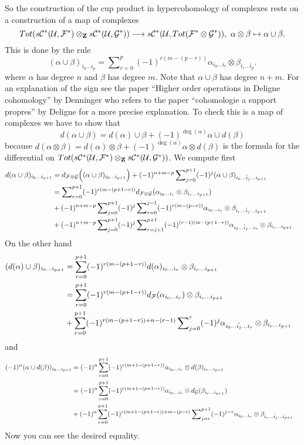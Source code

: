 \medskip\noindent
So the construction of the cup product in hypercohomology
of complexes rests on a construction of a map of complexes
$$
Tot(s{\mathcal C}^*({\mathcal U}, {\mathcal F}^*)
\otimes_{\bf Z}
s{\mathcal C}^*({\mathcal U}, {\mathcal G}^*))
\longrightarrow 
s{\mathcal C}^*({\mathcal U}, Tot({\mathcal F}^*\otimes {\mathcal G}^*)),\ 
\alpha \otimes \beta \mapsto \alpha \cup \beta.
$$
This is done by the rule
$$
(\alpha \cup \beta)_{i_0\ldots i_p}
=
\sum\nolimits_{r=0}^p
(-1)^{r(m-(p-r))}
\alpha_{i_0\ldots i_r} \otimes \beta_{i_r\ldots i_p}.
$$
where $\alpha$ has degree $n$ and $\beta$ has degree $m$.
Note that $\alpha \cup \beta$ has degree $n+m$.
For an explanation of the sign see the paper
``Higher order operations in Deligne cohomology'' by Denninger
who refers to the paper ``cohomologie a support propres'' by Deligne
for a more precise explanation.
To check this is a map of complexes we have to show that
$$
d(\alpha \cup \beta) = 
d(\alpha) \cup \beta +
(-1)^{\deg(\alpha)} \alpha \cup d(\beta)
$$
because $d(\alpha \otimes \beta) = d(\alpha)\otimes\beta
+ (-1)^{\deg(\alpha)} \alpha\otimes d(\beta)$ is the formula
for the differential on $Tot(s{\mathcal C}^*({\mathcal U}, {\mathcal F}^*)
\otimes_{\bf Z} s{\mathcal C}^*({\mathcal U}, {\mathcal G}^*))$. We compute
first
\begin{align}
d(\alpha \cup \beta)_{i_0\ldots i_{p+1}}
& =
d_{{\mathcal F}\otimes {\mathcal G}}
\Big(
(\alpha \cup \beta)_{i_0\ldots i_{p+1}}
\Big)
+
(-1)^{n+m-p}
\sum\nolimits_{j=0}^{p+1}
(-1)^j
(\alpha \cup \beta)_{i_0\ldots\hat i_j\ldots i_{p+1}}
\cr
& =
\sum\nolimits_{r=0}^{p+1}
(-1)^{r(m-(p+1-r))}
d_{{\mathcal F}\otimes {\mathcal G}}
(
\alpha_{i_0\ldots i_r} \otimes \beta_{i_r\ldots i_{p+1}}
)
\cr
& +
(-1)^{n+m-p}
\sum\nolimits_{j=0}^{p+1}
(-1)^j
\sum\nolimits_{r=0}^{j-1}
(-1)^{r(m-(p-r))}
\alpha_{i_0\ldots i_r} \otimes \beta_{i_r\ldots\hat i_j\ldots i_{p+1}}
\cr
& +
(-1)^{n+m-p}
\sum\nolimits_{j=0}^{p+1}
(-1)^j
\sum\nolimits_{r=j+1}^{p+1}
(-1)^{(r-1)(m-(p+1-r))}
\alpha_{i_0\ldots\hat i_j\ldots i_r} \otimes \beta_{i_r\ldots i_{p+1}}
\end{align}
On the other hand
\begin{align}
(d(\alpha) \cup \beta)_{i_0\ldots i_{p+1}}
& =
\sum_{r=0}^{p+1}
(-1)^{r(m-(p+1-r))}
d(\alpha)_{i_0\ldots i_r} \otimes \beta_{i_r\ldots i_{p+1}}
\cr
& =
\sum_{r=0}^{p+1}
(-1)^{r(m-(p+1-r))}
d_{\mathcal F}(\alpha_{i_0\ldots i_r}) \otimes \beta_{i_r\ldots i_{p+1}}
\cr
& +
\sum_{r=0}^{p+1}
(-1)^{r(m-(p+1-r))+n-(r-1)}
\sum\nolimits_{j=0}^{r}
(-1)^j
\alpha_{i_0\ldots\hat{i_j}\ldots i_r} \otimes \beta_{i_r\ldots i_{p+1}}
\end{align}
and
\begin{align}
(-1)^n (\alpha \cup d(\beta))_{i_0\ldots i_{p+1}}
& =
(-1)^n
\sum_{r=0}^{p+1}
(-1)^{r(m+1-(p+1-r))}
\alpha_{i_0\ldots i_r} \otimes d(\beta)_{i_r\ldots i_{p+1}}
\cr
& =
(-1)^n
\sum_{r=0}^{p+1}
(-1)^{r(m+1-(p+1-r))}
\alpha_{i_0\ldots i_r} \otimes d_{\mathcal G}(\beta_{i_r\ldots i_{p+1}})
\cr
& +
(-1)^n
\sum_{r=0}^{p+1}
(-1)^{r(m+1-(p+1-r))+m-(p-r)}
\sum\nolimits_{j=r}^{p+1}
(-1)^{j-r}
\alpha_{i_0\ldots i_r} \otimes \beta_{i_r\ldots\hat{i_j}\ldots i_{p+1}}
\end{align}
Now you can see the desired equality.

